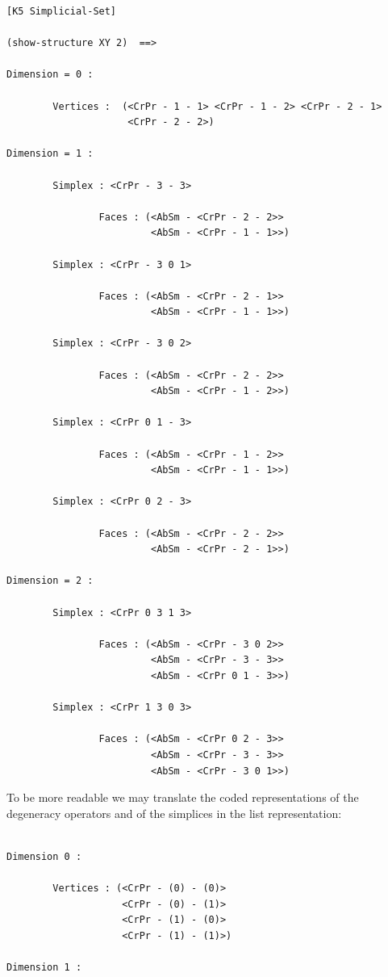 {{\begin{verbatim}
[K5 Simplicial-Set]

(show-structure XY 2)  ==>

Dimension = 0 :

        Vertices :  (<CrPr - 1 - 1> <CrPr - 1 - 2> <CrPr - 2 - 1>
                     <CrPr - 2 - 2>)

Dimension = 1 :

        Simplex : <CrPr - 3 - 3>

                Faces : (<AbSm - <CrPr - 2 - 2>>
                         <AbSm - <CrPr - 1 - 1>>)

        Simplex : <CrPr - 3 0 1>

                Faces : (<AbSm - <CrPr - 2 - 1>>
                         <AbSm - <CrPr - 1 - 1>>)

        Simplex : <CrPr - 3 0 2>

                Faces : (<AbSm - <CrPr - 2 - 2>>
                         <AbSm - <CrPr - 1 - 2>>)

        Simplex : <CrPr 0 1 - 3>

                Faces : (<AbSm - <CrPr - 1 - 2>>
                         <AbSm - <CrPr - 1 - 1>>)

        Simplex : <CrPr 0 2 - 3>

                Faces : (<AbSm - <CrPr - 2 - 2>>
                         <AbSm - <CrPr - 2 - 1>>)

Dimension = 2 :

        Simplex : <CrPr 0 3 1 3>

                Faces : (<AbSm - <CrPr - 3 0 2>>
                         <AbSm - <CrPr - 3 - 3>>
                         <AbSm - <CrPr 0 1 - 3>>)

        Simplex : <CrPr 1 3 0 3>

                Faces : (<AbSm - <CrPr 0 2 - 3>>
                         <AbSm - <CrPr - 3 - 3>>
                         <AbSm - <CrPr - 3 0 1>>)
\end{verbatim}}
To be more readable we may translate the coded representations of the de\-ge\-ne\-ra\-cy operators
and of the simplices in the list representation:
{\footnotesize\begin{verbatim}

Dimension 0 :

        Vertices : (<CrPr - (0) - (0)> 
                    <CrPr - (0) - (1)> 
                    <CrPr - (1) - (0)> 
                    <CrPr - (1) - (1)>)

Dimension 1 :


\end{verbatim}}}
